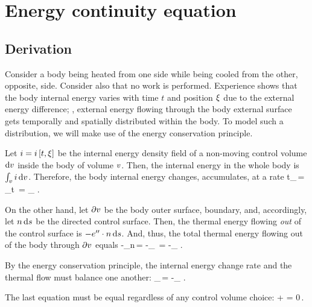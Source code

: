 \section{Energy continuity equation}

\subsection{Derivation}
Consider a body being heated from one side while being cooled from the other, opposite, side. Consider also that no work is performed. Experience shows that the body internal energy varies with time $t$ and position $\xi$ due to the external energy difference; \ie, external energy flowing through the body external surface gets temporally and spatially distributed within the body. To model such a distribution, we will make use of the energy conservation principle.

Let $i = i\left[{t, \xi}\right]$ be the internal energy density field of a non-moving control volume $\text{d}v$ inside the body of volume $v$. Then, the internal energy in the whole body is $\int_v i\,\text{d}v$. Therefore, the body internal energy changes, accumulates, at a rate 
\beq
\iod t\int_\vol \ien\,\dx\vol = \int_\vol\ipd t\ien\,\dx\vol
                              = \int_\vol\rate\ien\,\dx\vol\,.
\eeq

On the other hand, let $\partial v$ be the body outer surface, boundary, and, accordingly, let $n\,\text{d}s$ be the directed control surface. Then, the thermal energy flowing \emph{out} of the control surface is $-{e}^{\prime\prime}\cdot n\,\text{d}s$. And, thus, the total thermal energy flowing out of the body through $\partial v$ equals
\beq
-\int_{\bound\vol}\flux\then\iprod n\,\dx\surf = -\int_{\vol}\gder\iprod\flux\then\,\dx\vol
                                               = -\int_{\vol}\div\flux\then\,\dx\vol\,.
\eeq

By the energy conservation principle, the internal energy change rate and the thermal flow must balance one another:
\beq
\int_\vol\rate\ien\,\dx\vol = -\int_{\vol}\div\flux\then\,\dx\vol\,.
\eeq

The last equation must be equal regardless of any control volume choice:
\beq
\rate\ien + \div\flux\then = 0\,.
\eeq

